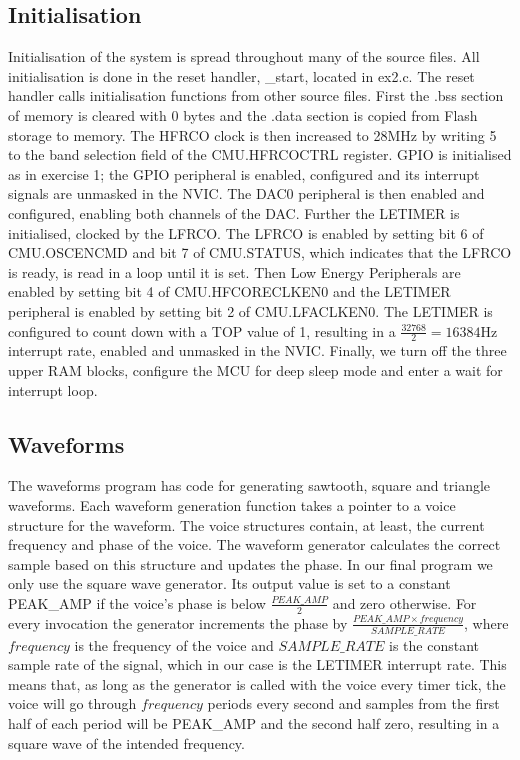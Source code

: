 \subsection{Initialisation}
Initialisation of the system is spread throughout many of the source files. All
initialisation is done in the reset handler, \_start, located in ex2.c. The
reset handler calls initialisation functions from other source files. First the
.bss section of memory is cleared with 0 bytes and the .data section is copied
from Flash storage to memory. The HFRCO clock is then increased to 28MHz by
writing 5 to the band selection field of the CMU.HFRCOCTRL register. GPIO is
initialised as in exercise 1; the GPIO peripheral is enabled, configured and its
interrupt signals are unmasked in the NVIC. The DAC0 peripheral is then enabled
and configured, enabling both channels of the DAC. Further the LETIMER is
initialised, clocked by the LFRCO. The LFRCO is enabled by setting bit 6 of
CMU.OSCENCMD and bit 7 of CMU.STATUS, which indicates that the LFRCO is ready,
is read in a loop until it is set. Then Low Energy Peripherals are enabled by
setting bit 4 of CMU.HFCORECLKEN0 and the LETIMER peripheral is enabled by
setting bit 2 of CMU.LFACLKEN0. The LETIMER is configured to count down with a
TOP value of 1, resulting in a \(\frac{32768}{2} = 16384\)Hz interrupt rate,
enabled and unmasked in the NVIC. Finally, we turn off the three upper RAM
blocks, configure the MCU for deep sleep mode and enter a wait for interrupt
loop.

\subsection{Waveforms}

The waveforms program has code for generating sawtooth, square and triangle
waveforms. Each waveform generation function takes a pointer to a voice
structure for the waveform. The voice structures contain, at least, the current
frequency and phase of the voice. The waveform generator calculates the correct
sample based on this structure and updates the phase. In our final program we
only use the square wave generator. Its output value is set to a constant
PEAK\_AMP if the voice's phase is below \(\frac{PEAK\_AMP}{2}\) and zero
otherwise. For every invocation the generator increments the phase by
\(\frac{PEAK\_AMP \times frequency}{SAMPLE\_RATE}\), where \(frequency\) is the
frequency of the voice and \(SAMPLE\_RATE\) is the constant sample rate of the
signal, which in our case is the LETIMER interrupt rate. This means that, as
long as the generator is called with the voice every timer tick, the voice will
go through \(frequency\) periods every second and samples from the first half of
each period will be PEAK\_AMP and the second half zero, resulting in a square
wave of the intended frequency.

